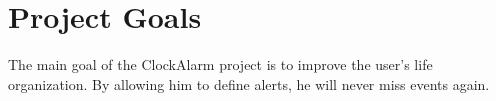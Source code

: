 \section{Project Goals}

The main goal of the ClockAlarm project is to improve the user's life
organization. By allowing him to define alerts, he will never miss events
again.

